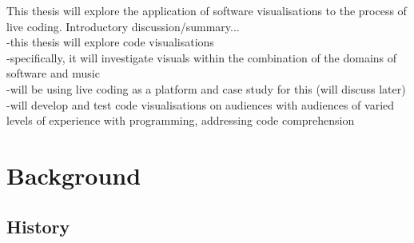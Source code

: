 This thesis will explore the application of software visualisations to the process of live coding.
Introductory discussion/summary...\\
-this thesis will explore code visualisations\\
-specifically, it will investigate visuals within the combination of the domains of software and music\\
-will be using live coding as a platform and case study for this (will discuss later)\\
-will develop and test code visualisations on audiences with audiences of varied levels of experience with programming, addressing code comprehension\\






\section{Background}

\subsection{History}


